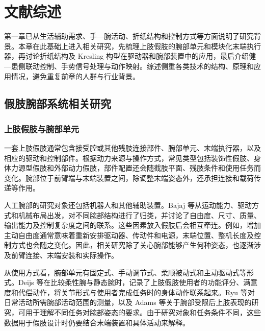 \chapter{文献综述}

第一章已从生活辅助需求、手—腕活动、折纸结构和控制方式等方面说明了研究背景。本章在此基础上进入相关研究，先梳理上肢假肢的腕部单元和模块化末端执行器，再讨论折纸结构及 Kresling 构型在驱动器和腕部装置中的应用，最后介绍健—患侧联动控制、手势信号处理与动作映射。综述侧重各类技术的结构、原理和应用情况，避免重复前章的人群与行业背景。

\section{假肢腕部系统相关研究}

\subsection{上肢假肢与腕部单元}

一套上肢假肢通常包含接受腔或其他残肢连接部件、腕部单元、末端执行器，以及相应的驱动和控制部件。根据动力来源与操作方式，常见类型包括装饰性假肢、身体力源型假肢和外部动力假肢，部件配置还会随截肢平面、残肢条件和使用任务而变化\cite{Fink2023UpperExtremityProstheses}。腕部位于前臂端与末端装置之间，除调整末端姿态外，还承担连接和载荷传递等作用。


人工腕部的研究对象还包括机器人和其他辅助装置。Bajaj 等从运动能力、驱动方式和机械布局出发，对不同腕部结构进行了归类，并讨论了自由度、尺寸、质量、输出能力及控制复杂度之间的联系\cite{Bajaj2019ArtificialWrists}。这些因素放入假肢后会相互牵连。例如，增加主动自由度通常意味着重新安排驱动器、传动件和电源，末端位置、整机长度及控制方式也会随之变化。因此，相关研究除了关心腕部能够产生何种姿态，也逐渐涉及前臂连接、末端安装和实际操作。

从使用方式看，腕部单元有固定式、手动调节式、柔顺被动式和主动驱动式等形式。Deijs 等在比较柔性腕与静态腕时，记录了上肢假肢使用者的功能评分、满意度和代偿动作，将关节形式与使用者完成任务时的身体动作联系起来\cite{Deijs2016FlexibleStaticWrists}。Ryu 等对日常活动所需腕部活动范围的测量，以及 Adams 等关于腕部受限后上肢表现的研究，可用于理解不同任务对腕部姿态的要求\cite{Ryu1991FunctionalWristROM,Adams2003ImpairedWristMotion}。由于研究对象和任务条件不同，这些数据用于假肢设计时仍要结合末端装置和具体活动来解释。

